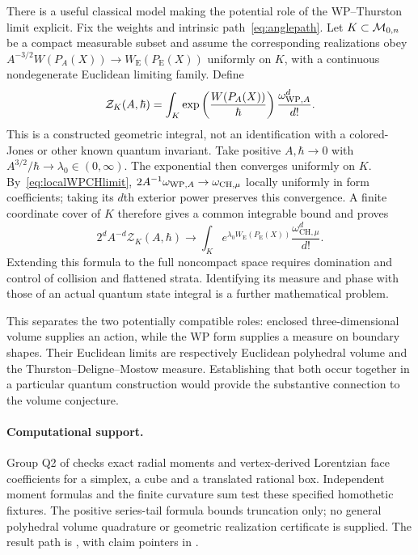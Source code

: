 There is a useful classical model making the potential role of
the WP--Thurston limit explicit. Fix the weights and intrinsic
path~\eqref{eq:anglepath}. Let $K\subset\mathcal M_{0,n}$ be a compact
measurable subset and assume the corresponding realizations obey
$A^{-3/2}W(P_A(X))\to W_{\mathrm E}(P_{\mathrm E}(X))$ uniformly
on $K$, with a continuous nondegenerate Euclidean limiting family.
Define
\begin{equation}
 \mathcal Z_K(A,\hbar)=\int_K
       \exp\left(\frac{W(P_A(X))}{\hbar}\right)
       \frac{\omega_{\mathrm{WP},A}^d}{d!}.
 \label{eq:modelpartition}
\end{equation}
This is a constructed geometric integral, not an identification
with a colored-Jones or other known quantum invariant. Take positive $A,\hbar\to0$ with
$A^{3/2}/\hbar\to\lambda_0\in(0,\infty)$. The exponential
then converges uniformly on $K$. By~\eqref{eq:localWPCHlimit},
$2A^{-1}\omega_{\mathrm{WP},A}\to\omega_{\mathrm{CH},\mu}$ locally
uniformly in form coefficients; taking its $d$th exterior power
preserves this convergence. A finite coordinate cover of $K$
therefore gives a common integrable bound and proves
\begin{equation}
 2^d A^{-d}\mathcal Z_K(A,\hbar)\longrightarrow
 \int_K e^{\lambda_0 W_{\mathrm E}(P_{\mathrm E}(X))}
                 \frac{\omega_{\mathrm{CH},\mu}^d}{d!}.
 \label{eq:modelpartitionlimit}
\end{equation}
Extending this formula to the full noncompact space requires
 domination and control of collision and flattened strata.
 Identifying its measure and phase with those of an actual quantum
 state integral is a further mathematical problem.

This separates the two potentially compatible roles: enclosed
three-dimensional volume supplies an action, while the WP form
supplies a measure on boundary shapes. Their Euclidean limits
are respectively Euclidean polyhedral volume and the
Thurston--Deligne--Mostow measure. Establishing that both occur
together in a particular quantum construction would provide the
substantive connection to the volume conjecture.

\paragraph{Computational support.}
Group Q2 of  checks
exact radial moments and vertex-derived Lorentzian face coefficients
for a simplex, a cube and a translated rational box. Independent
moment formulas and the finite curvature sum test these specified
homothetic fixtures. The positive series-tail formula bounds truncation
only; no general polyhedral volume quadrature or geometric realization
certificate is supplied. The result path is
, with claim pointers in
.
